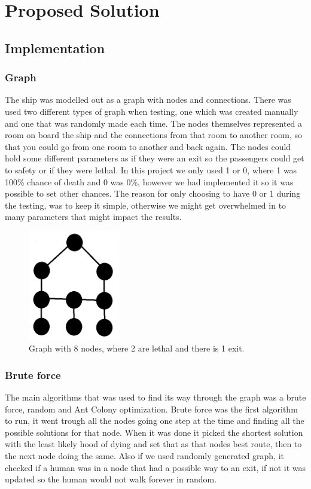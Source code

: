 \chapter{Proposed Solution}
\label{ch:solution}


\section{Implementation}

\subsection{Graph}
The ship was modelled out as a graph with nodes and connections. There was used two different types of graph when testing, one which was created manually and one that was randomly made each time. The nodes themselves represented a room on board the ship and the connections from that room to another room, so that you could go from one room to another and back again. The nodes could hold some different parameters as if they were an exit so the passengers could get to safety or if they were lethal. In this project we only used 1 or 0, where 1 was 100\% chance of death and 0 was 0\%, however we had implemented it so it was possible to set other chances. The reason for only choosing to have 0 or 1 during the testing, was to keep it simple, otherwise we might get overwhelmed in to many parameters that might impact the results. 
\begin{figure} %
\includegraphics[width=40mm]{manuallyGraph.png}
\caption{Graph with 8 nodes, where 2 are lethal and there is 1 exit.}
\label{smalgraph}
\end{figure}

\subsection{Brute force}
The main algorithms that was used to find its way through the graph was a brute force, random and Ant Colony optimization. Brute force was the first algorithm to run, it went trough all the nodes going one step at the time and finding all the possible solutions for that node. When it was done it picked the shortest solution with the least likely hood of dying and set that as that nodes best route, then to the next node doing the same. Also if we used randomly generated graph, it checked if a human was in a node that had a possible way to an exit, if not it was updated so the human would not walk forever in random. 

